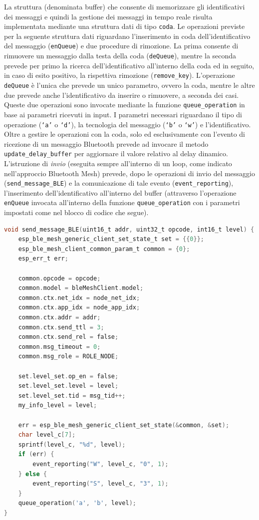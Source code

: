\noindent La struttura (denominata buffer) che consente di memorizzare gli identificativi dei messaggi e quindi la gestione dei messaggi in tempo reale risulta implementata mediante una struttura dati di tipo \texttt{coda}. Le operazioni previste per la seguente struttura dati riguardano l'inserimento in coda dell'identificativo del messaggio (\texttt{enQueue}) e due procedure di rimozione. La prima consente di rimuovere un messaggio dalla testa della coda (\texttt{deQueue}), mentre la seconda prevede per primo la ricerca dell'identificativo all'interno della coda ed in seguito, in caso di esito positivo, la rispettiva rimozione (\texttt{remove\_key}). L'operazione \texttt{deQueue} è l'unica che prevede un unico parametro, ovvero la coda, mentre le altre due prevede anche l'identificativo da inserire o rimuovere, a seconda dei casi. Queste due operazioni sono invocate mediante la funzione \texttt{queue\_operation} in base ai parametri ricevuti in input. I parametri necessari riguardano il tipo di operazione (\texttt{`a'} o \texttt{`d'}), la tecnologia del messaggio (\texttt{`b'} o \texttt{`w'}) e l'identificativo. Oltre a gestire le operazioni con la coda, solo ed esclusivamente con l'evento di ricezione di un messaggio Bluetooth prevede ad invocare il metodo \texttt{update\_delay\_buffer} per aggiornare il valore relativo al delay dinamico.\\

\noindent L'istruzione di \textit{invio} (eseguita sempre all'interno di un loop, come indicato nell'approccio Bluetooth Mesh) prevede, dopo le operazioni di invio del messaggio (\texttt{send\_message\_BLE}) e la comunicazione di tale evento (\texttt{event\_reporting}), l'inserimento dell'identificativo all'interno del buffer (attraverso l'operazione \texttt{enQueue} invocata all'interno della funzione \texttt{queue\_operation} con i parametri impostati come nel blocco di codice che segue). 

\begin{lstlisting}[language=C, caption= evento d'invio con rispettiva segnalazione e utilizzo della coda]
void send_message_BLE(uint16_t addr, uint32_t opcode, int16_t level) {
    esp_ble_mesh_generic_client_set_state_t set = {{0}};
    esp_ble_mesh_client_common_param_t common = {0};
    esp_err_t err;

    common.opcode = opcode;
    common.model = bleMeshClient.model;
    common.ctx.net_idx = node_net_idx;
    common.ctx.app_idx = node_app_idx;
    common.ctx.addr = addr;
    common.ctx.send_ttl = 3;
    common.ctx.send_rel = false;
    common.msg_timeout = 0;
    common.msg_role = ROLE_NODE;

    set.level_set.op_en = false;
    set.level_set.level = level;
    set.level_set.tid = msg_tid++;
    my_info_level = level;

    err = esp_ble_mesh_generic_client_set_state(&common, &set);
    char level_c[7];
    sprintf(level_c, "%d", level);    
    if (err) {
        event_reporting("W", level_c, "0", 1);
    } else {
        event_reporting("S", level_c, "3", 1);
    }
    queue_operation('a', 'b', level);
}
\end{lstlisting}

